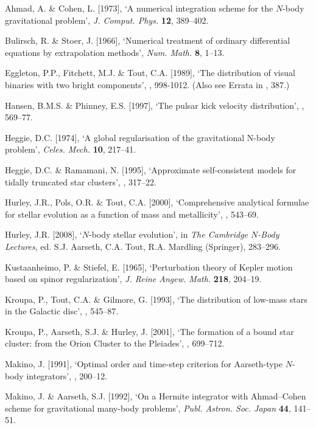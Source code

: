 \documentclass[12pt]{article}
\begin{document}
\medskip
\noindent
Ahmad, A. \& Cohen, L. [1973], `A numerical integration scheme for the $N$-body
gravitational problem', {\it J. Comput. Phys.} {\bf 12}, 389--402.

\medskip
\noindent
Bulirsch, R. \& Stoer, J. [1966], `Numerical treatment of ordinary differential
equations by extrapolation methods',
{\it Num. Math.} {\bf 8}, 1--13.

\medskip
\noindent
Eggleton, P.P., Fitchett, M.J. \& Tout, C.A. [1989], `The distribution of visual
binaries with two bright components',
, 998-1012. (Also see Errata in , 387.)

\medskip
\noindent
Hansen, B.M.S. \& Phinney, E.S. [1997], `The pulsar kick velocity distribution',
, 569--77.

\medskip
\noindent
Heggie, D.C. [1974], `A global regularisation of the gravitational N-body problem',
{\it Celes. Mech.} {\bf 10}, 217--41.

\medskip
\noindent
Heggie, D.C. \& Ramamani, N. [1995], `Approximate self-consistent models for
tidally truncated star clusters',
, 317--22.

\medskip
\noindent
Hurley, J.R., Pols, O.R. \& Tout, C.A. [2000], `Comprehensive analytical formulae
for stellar evolution as a function of mass and metallicity',
, 543--69.

\medskip
\noindent
Hurley, J.R. [2008], `$N$-body stellar evolution',
in {\it The Cambridge $N$-Body Lectures}, ed. S.J. Aarseth, C.A. Tout,
R.A. Mardling (Springer), 283--296.

\medskip
\noindent
Kustaanheimo, P. \& Stiefel, E. [1965], `Perturbation theory of Kepler motion
based on spinor regularization',
{\it J. Reine Angew. Math.} {\bf 218}, 204--19.

\medskip
\noindent
Kroupa, P., Tout, C.A. \& Gilmore, G. [1993], `The distribution of low-mass stars
in the Galactic disc',
, 545--87.

\medskip
\noindent
Kroupa, P., Aarseth, S.J. \& Hurley, J. [2001], `The formation of a bound star
cluster: from the Orion Cluster to the Pleiades', , 699--712.

\medskip
\noindent
Makino, J. [1991], `Optimal order and time-step criterion for Aarseth-type
$N$-body integrators', , 200--12.

\medskip
\noindent
Makino, J. \& Aarseth, S.J. [1992], `On a Hermite integrator with Ahmad--Cohen
scheme for gravitational many-body problems',
{\it Publ. Astron. Soc. Japan} {\bf 44}, 141--51.
\end{document}
